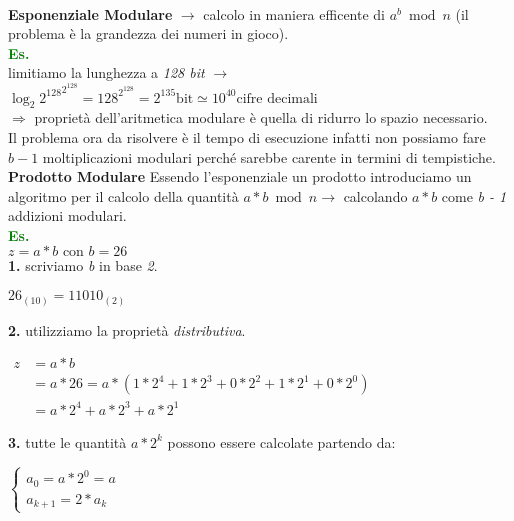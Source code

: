 \   \\ \newline
\textbf{Esponenziale Modulare} $\rightarrow$ calcolo in maniera efficente di $a^b \bmod n$ (il problema è la grandezza dei numeri in gioco).
\   \\
\textcolor{green}{\textbf{Es.}} \\
limitiamo la lunghezza a \textit{128 bit} $\rightarrow$ ${\log_{2}{2^{128}}}^{2^{128}} = 128 ^ {2^{128}} = 2^{135} \text{bit} \simeq 10^{40} \text{cifre decimali}$ \\
$\Rightarrow$ proprietà dell'aritmetica modulare è quella di ridurro lo spazio necessario. \\
Il problema ora da risolvere è il tempo di esecuzione infatti non possiamo fare $b - 1$ moltiplicazioni modulari perché sarebbe carente in termini di tempistiche.
\\ \newline
\textbf{Prodotto Modulare}
Essendo l'esponenziale un prodotto introduciamo un algoritmo per il calcolo della quantità $a * b \bmod n \rightarrow $ calcolando $a * b$ come \textit{b - 1} addizioni modulari.
\\ \newline
\textcolor{green}{\textbf{Es.}} \\
$z = a * b \text{ con } b = 26$ \\
\textbf{1.} scriviamo \textit{b} in base \textit{2}.
\begin{center}
    $26_{(10)} = 11010_{(2)}$ \\
\end{center}
\textbf{2.} utilizziamo la proprietà \textit{distributiva}.
\begin{center}
    \begin{math}
        \begin{aligned}
            z& = a * b \\
            & = a * 26 = a * (1 * 2^4 + 1 * 2^3 + 0 * 2^2 + 1 * 2^1 + 0 * 2^0) \\
            & = a * 2^4 + a * 2^3 + a * 2^1
        \end{aligned}
    \end{math}
\end{center}
\textbf{3.} tutte le quantità $a * 2^k$ possono essere calcolate partendo da:
\begin{center}
    \begin{math} 
        \begin{cases}
            a_0 = a * 2^0 = a \\
            a_{k + 1} = 2 * a_k
        \end{cases}
    \end{math}
\end{center}
